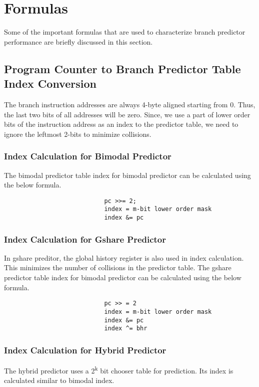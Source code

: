 \section{Formulas}
Some of the important formulas that are used to characterize branch predictor performance are briefly discussed in this section.

\subsection{Program Counter to Branch Predictor Table Index Conversion}
The branch instruction addresses are always 4-byte aligned starting from 0. Thus, the last two bits of all addresses will be zero. Since, we use a part of lower order bits of the instruction address as an index to the predictor table, we need to ignore the leftmost 2-bits to minimize collisions.

\subsubsection{Index Calculation for Bimodal Predictor}
The bimodal predictor table index for bimodal predictor can be calculated using the below formula.

\begin{verbatim}
                            pc >>= 2;
                            index = m-bit lower order mask
                            index &= pc
\end{verbatim}

\subsubsection{Index Calculation for Gshare Predictor}
In gshare preditor, the global history register is also used in index calculation. This minimizes the number of collisions in the predictor table. The gshare predictor table index for bimodal predictor can be calculated using the below formula.

\begin{verbatim}
                            pc >> = 2
                            index = m-bit lower order mask
                            index &= pc
                            index ^= bhr
\end{verbatim}

\subsubsection{Index Calculation for Hybrid Predictor}
The hybrid predictor uses a 2\textsuperscript{k} bit chooser table for prediction. Its index is calculated similar to bimodal index.

